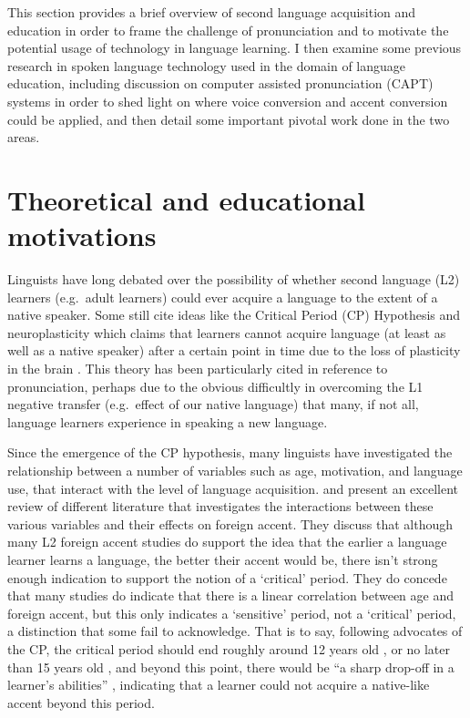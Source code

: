 \documentclass
[
    a4paper,
    twoside,
    12pt,
]
{report}
\begin{document}
This section provides a brief overview of second language acquisition
and education in order to frame the challenge of pronunciation and to
motivate the potential usage of technology in language learning. I then
examine some previous research in spoken language technology used in the
domain of language education, including discussion on computer assisted
pronunciation (CAPT) systems in order to shed light on where voice
conversion and accent conversion could be applied, and then detail some
important pivotal work done in the two areas.

\hypertarget{theoretical-and-educational-motivations}{%
\section{Theoretical and educational
motivations}\label{theoretical-and-educational-motivations}}

Linguists have long debated over the possibility of whether second
language (L2) learners (e.g.~adult learners) could ever acquire a
language to the extent of a native speaker. Some still cite ideas like
the Critical Period (CP) Hypothesis and neuroplasticity which claims
that learners cannot acquire language (at least as well as a native
speaker) after a certain point in time due to the loss of plasticity in
the brain \parencite{lenneberg1967a,scovel1988a}. This theory has been
particularly cited in reference to pronunciation, perhaps due to the
obvious difficultly in overcoming the L1 negative transfer (e.g.~effect
of our native language) that many, if not all, language learners
experience in speaking a new language.

Since the emergence of the CP hypothesis, many linguists have
investigated the relationship between a number of variables such as age,
motivation, and language use, that interact with the level of language
acquisition. \textcite{piske2001} and \textcite{lengeris2012} present an
excellent review of different literature that investigates the
interactions between these various variables and their effects on
foreign accent. They discuss that although many L2 foreign accent
studies do support the idea that the earlier a language learner learns a
language, the better their accent would be, there isn't strong enough
indication to support the notion of a `critical' period. They do concede
that many studies do indicate that there is a linear correlation between
age and foreign accent, but this only indicates a `sensitive' period,
not a `critical' period, a distinction that some fail to acknowledge.
That is to say, following advocates of the CP, the critical period
should end roughly around 12 years old \parencite{scovel1988a}, or no
later than 15 years old \parencite{patkowski1990}, and beyond this
point, there would be ``a sharp drop-off in a learner's abilities''
\parencite{lengeris2012}, indicating that a learner could not acquire a
native-like accent beyond this period.
\end{document}
